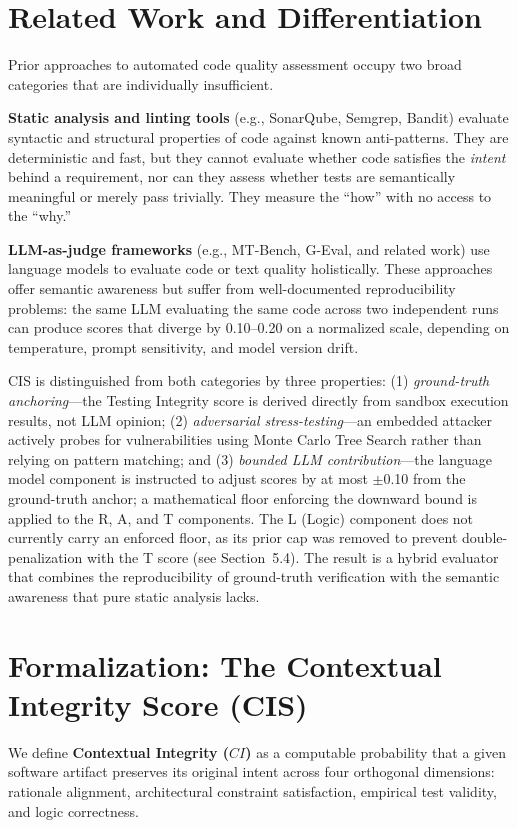 \documentclass[11pt, a4paper]{article}
\begin{document}
\section{Related Work and Differentiation}

Prior approaches to automated code quality assessment occupy two broad categories that are individually insufficient.

\textbf{Static analysis and linting tools} (e.g., SonarQube, Semgrep, Bandit) evaluate syntactic and structural properties of code against known anti-patterns. They are deterministic and fast, but they cannot evaluate whether code satisfies the \emph{intent} behind a requirement, nor can they assess whether tests are semantically meaningful or merely pass trivially. They measure the ``how'' with no access to the ``why.''

\textbf{LLM-as-judge frameworks} (e.g., MT-Bench, G-Eval, and related work) use language models to evaluate code or text quality holistically. These approaches offer semantic awareness but suffer from well-documented reproducibility problems: the same LLM evaluating the same code across two independent runs can produce scores that diverge by 0.10--0.20 on a normalized scale, depending on temperature, prompt sensitivity, and model version drift.

CIS is distinguished from both categories by three properties: (1) \emph{ground-truth anchoring}—the Testing Integrity score is derived directly from sandbox execution results, not LLM opinion; (2) \emph{adversarial stress-testing}—an embedded attacker actively probes for vulnerabilities using Monte Carlo Tree Search rather than relying on pattern matching; and (3) \emph{bounded LLM contribution}—the language model component is instructed to adjust scores by at most $\pm$0.10 from the ground-truth anchor; a mathematical floor enforcing the downward bound is applied to the R, A, and T components. The L (Logic) component does not currently carry an enforced floor, as its prior cap was removed to prevent double-penalization with the T score (see Section~5.4). The result is a hybrid evaluator that combines the reproducibility of ground-truth verification with the semantic awareness that pure static analysis lacks.

\section{Formalization: The Contextual Integrity Score (CIS)}

We define \textbf{Contextual Integrity ($CI$)} as a computable probability that a given software artifact preserves its original intent across four orthogonal dimensions: rationale alignment, architectural constraint satisfaction, empirical test validity, and logic correctness.
\end{document}
